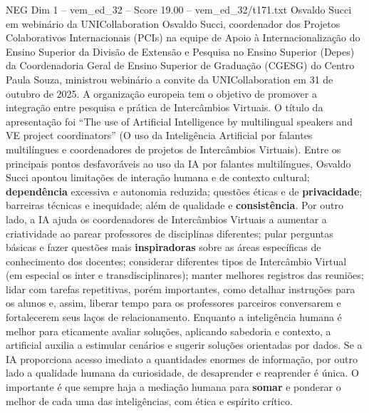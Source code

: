 \begin{textsample}{NEG Dim 1 – vem\_ed\_32 – Score 19.00 – vem\_ed\_32/t171.txt}  \label{ex:f1_neg_156}
Osvaldo Succi em webinário da UNICollaboration Osvaldo Succi, coordenador dos Projetos Colaborativos Internacionais (PCIs) na equipe de Apoio à Internacionalização do Ensino Superior da Divisão de Extensão e Pesquisa no Ensino Superior (Depes) da Coordenadoria Geral de Ensino Superior de Graduação (CGESG) do Centro Paula Souza, ministrou webinário a convite da UNICollaboration em 31 de outubro de 2025.
A organização europeia tem o objetivo de promover a integração entre pesquisa e prática de Intercâmbios Virtuais.
O título da apresentação foi “The use of Artificial Intelligence by multilingual speakers and VE project coordinators” (O uso da Inteligência Artificial por falantes multilíngues e coordenadores de projetos de Intercâmbios Virtuais).
Entre os principais pontos desfavoráveis ao uso da IA por falantes multilíngues, Osvaldo Succi apontou limitações de interação humana e de contexto cultural; \textbf{dependência} excessiva e autonomia reduzida; questões éticas e de \textbf{privacidade}; barreiras técnicas e inequidade; além de qualidade e \textbf{consistência}.
Por outro lado, a IA ajuda os coordenadores de Intercâmbios Virtuais a aumentar a criatividade ao parear professores de disciplinas diferentes; pular perguntas básicas e fazer questões mais \textbf{inspiradoras} sobre as áreas específicas de conhecimento dos docentes; considerar diferentes tipos de Intercâmbio Virtual (em especial os inter e transdisciplinares); manter melhores registros das reuniões; lidar com tarefas repetitivas, porém importantes, como detalhar instruções para os alunos e, assim, liberar tempo para os professores parceiros conversarem e fortalecerem seus laços de relacionamento.
Enquanto a inteligência humana é melhor para eticamente avaliar soluções, aplicando sabedoria e contexto, a artificial auxilia a estimular cenários e sugerir soluções orientadas por dados.
Se a IA proporciona acesso imediato a quantidades enormes de informação, por outro lado a qualidade humana da curiosidade, de desaprender e reaprender é única.
O importante é que sempre haja a mediação humana para \textbf{somar} e ponderar o melhor de cada uma das inteligências, com ética e espírito crítico.

\end{textsample}
